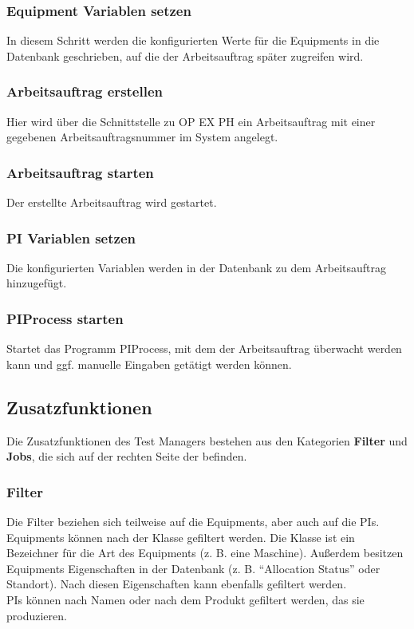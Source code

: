 \subsubsection{Equipment Variablen setzen}
In diesem Schritt werden die konfigurierten Werte für die Equipments in die Datenbank geschrieben, auf die der Arbeitsauftrag später zugreifen wird.

\subsubsection{Arbeitsauftrag erstellen}
Hier wird über die Schnittstelle zu \gls{OP EX PH} ein Arbeitsauftrag mit einer gegebenen Arbeitsauftragsnummer im System angelegt.

\subsubsection{Arbeitsauftrag starten}
Der erstellte Arbeitsauftrag wird gestartet.

\subsubsection{PI Variablen setzen}
Die konfigurierten Variablen werden in der Datenbank zu dem Arbeitsauftrag hinzugefügt.

\subsubsection{PIProcess starten}
Startet das Programm PIProcess, mit dem der Arbeitsauftrag überwacht werden kann und ggf. manuelle Eingaben getätigt werden können.

\subsection{Zusatzfunktionen}\label{sub_sec-test_manager-advanced}
Die Zusatzfunktionen des Test Managers bestehen aus den Kategorien \textbf{Filter} und \textbf{Jobs}, die sich auf der rechten Seite der  befinden.

\subsubsection{Filter}
Die Filter beziehen sich teilweise auf die Equipments, aber auch auf die \glspl{PI}.\\
Equipments können nach der Klasse gefiltert werden. Die Klasse ist ein Bezeichner für die Art des Equipments (z. B. eine Maschine). Außerdem besitzen Equipments Eigenschaften in der Datenbank (z. B. \enquote{Allocation Status} oder Standort). Nach diesen Eigenschaften kann ebenfalls gefiltert werden.\\
\glspl{PI} können nach Namen oder nach dem Produkt gefiltert werden, das sie produzieren.


